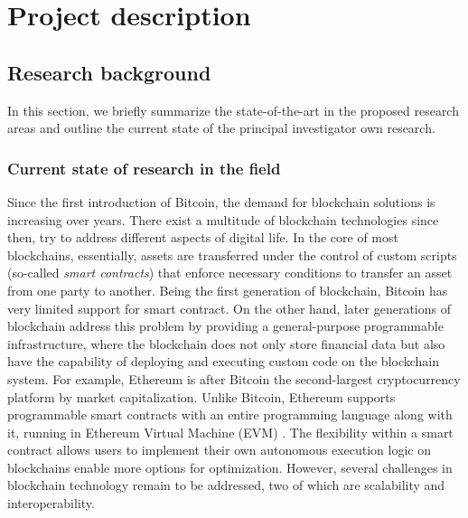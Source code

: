 \newpage
\setcounter{page}{1}
\section{Project description}

\subsection{Research background}

In this section, we briefly summarize the state-of-the-art in the proposed
research areas and outline the current state of the principal investigator own
research.

\subsubsection{Current state of research in the field}
Since the first introduction of Bitcoin, the demand for blockchain solutions is
increasing over years. There exist a multitude of blockchain technologies since
then, try to address different aspects of digital life. In the core of most
blockchains, essentially, assets are transferred under the control of custom
scripts (so-called \emph{smart contracts}) that enforce necessary conditions to
transfer an asset from one party to another. Being the first generation of
blockchain, Bitcoin has very limited support for smart contract. On the other
hand, later generations of blockchain address this problem by providing a
general-purpose programmable infrastructure, where the blockchain does not only
store financial data but also have the capability of deploying and executing
custom code on the blockchain system. For example, Ethereum is after Bitcoin the
second-largest cryptocurrency platform by market capitalization. Unlike Bitcoin,
Ethereum supports programmable smart contracts with an entire programming
language along with it, running in Ethereum Virtual Machine (EVM)
\cite{ethereum:evm}. The flexibility within a smart contract allows users to
implement their own autonomous execution logic on blockchains enable more
options for optimization. However, several challenges in blockchain technology
remain to be addressed, two of which are scalability and interoperability.

